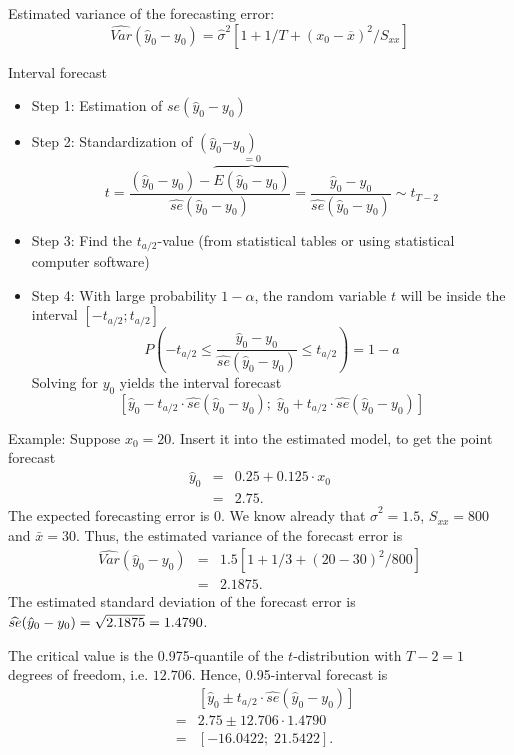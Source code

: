 \documentclass{article}
\begin{document}
Estimated variance of the forecasting error:
\[ \widehat{Var}(\hat{y}_{0}-y_{0})=\hat{\sigma}^{2}\left[ 1+1/T+\left( x_{0}-\overline{x}\right) ^{2}/S_{xx}\right] \]

Interval forecast
\begin{itemize}
\item Step 1: Estimation of $se(\hat{y}_{0}-y_{0})$
\item Step 2: Standardization of $\left( \hat{y}_{0}\mathbf{-}y_{0}\right)$
\[ t=\frac{(\hat{y}_{0}-y_0)-\overbrace{E(\hat{y}_{0}-y_{0})}^{=0}}
{\widehat{se}(\hat{y}_{0}-y_{0})}=\frac{\hat{y}_{0}-y_{0}}{\widehat{se}(\hat{y}_{0}-y_{0})}\sim t_{T-2} \]
\item  Step 3: Find the $t_{a/2}$-value (from statistical tables or using
statistical computer software)
\item Step 4: With large probability $1-\alpha $, the random variable $t$
will be inside the interval $[-t_{a/2}; t_{a/2}]$
\[ P\left( -t_{a/2}\leq \frac{\hat{y}_{0}-y_{0}}{\widehat{se}(\hat{y}_0-y_0)}\leq t_{a/2}\right) =1-a \]
Solving for $y_0$ yields the interval forecast
\[ \left[ \hat{y}_{0}-t_{a/2}\cdot \widehat{se}(\hat{y}_{0}-y_{0});\;\hat{y}_{0}
+t_{a/2}\cdot \widehat{se}(\hat{y}_{0}-y_{0})\right] \]
\end{itemize}

Example:
Suppose $x_{0}=20$. Insert it into the estimated model, to get the point
forecast 
\begin{eqnarray*}
	\widehat{y}_{0} &=&0.25+0.125\cdot x_{0} \\
	&=&2.75.
\end{eqnarray*}%
The expected forecasting error is 0. We know already that $\hat{\sigma}%
^{2}=1.5$, $S_{xx}=800$ and $\bar{x}=30$. Thus, the estimated variance of
the forecast error is%
\begin{eqnarray*}
	\widehat{Var}(\hat{y}_{0}-y_{0}) &=&1.5\left[ 1+1/3+\left( 20-30\right)
	^{2}/800\right] \\
	&=&2.1875.
\end{eqnarray*}%
The estimated standard deviation of the forecast error is $\widehat{se}(\hat{%
	y}_{0}-y_{0})=\sqrt{2.1875}=1.4790$.

The critical value is the 0.975-quantile of the $t$-distribution with $T-2=1$
degrees of freedom, i.e. $12.706.$ Hence, 0.95-interval forecast is%
\begin{eqnarray*}
	&&\left[ \hat{y}_{0}\pm t_{a/2}\cdot \widehat{se}(\hat{y}_{0}-y_{0})\right]
	\\
	&=&2.75\pm 12.706\cdot 1.4790 \\
	&=&[-16.0422;\;21.5422].
\end{eqnarray*}
\end{document}
